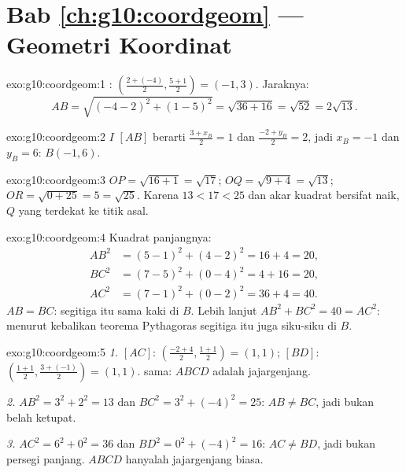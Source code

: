 \section*{Bab \ref{ch:g10:coordgeom} --- Geometri Koordinat}

\begin{solution}{exo:g10:coordgeom:1}
: $\left(\frac{2 + (-4)}{2}, \frac{5 + 1}{2}\right) = (-1, 3)$.
Jaraknya:
\[
AB = \sqrt{(-4 - 2)^2 + (1 - 5)^2} = \sqrt{36 + 16} = \sqrt{52}
= 2\sqrt{13}.
\]
\end{solution}

\begin{solution}{exo:g10:coordgeom:2}
$I$  $[AB]$ berarti $\frac{3 + x_B}{2} = 1$ dan
$\frac{-2 + y_B}{2} = 2$, jadi $x_B = -1$ dan $y_B = 6$: $B(-1, 6)$.
\end{solution}

\begin{solution}{exo:g10:coordgeom:3}
$OP = \sqrt{16 + 1} = \sqrt{17}$; $OQ = \sqrt{9 + 4} = \sqrt{13}$;
$OR = \sqrt{0 + 25} = 5 = \sqrt{25}$. Karena $13 < 17 < 25$ dan akar
kuadrat bersifat naik, $Q$ yang terdekat ke titik asal.
\end{solution}

\begin{solution}{exo:g10:coordgeom:4}
Kuadrat panjangnya:
\begin{align*}
AB^2 &= (5-1)^2 + (4-2)^2 = 16 + 4 = 20, \\
BC^2 &= (7-5)^2 + (0-4)^2 = 4 + 16 = 20, \\
AC^2 &= (7-1)^2 + (0-2)^2 = 36 + 4 = 40 .
\end{align*}
$AB = BC$: segitiga itu sama kaki di $B$. Lebih lanjut
$AB^2 + BC^2 = 40 = AC^2$: menurut kebalikan teorema Pythagoras segitiga
itu juga siku-siku di $B$.
\end{solution}

\begin{solution}{exo:g10:coordgeom:5}
\emph{1.}  $[AC]$:
$\left(\frac{-2+4}{2}, \frac{1+1}{2}\right) = (1, 1)$; 
$[BD]$: $\left(\frac{1+1}{2}, \frac{3+(-1)}{2}\right) = (1, 1)$.  sama: $ABCD$ adalah jajargenjang.

\emph{2.} $AB^2 = 3^2 + 2^2 = 13$ dan $BC^2 = 3^2 + (-4)^2 = 25$:
$AB \neq BC$, jadi bukan belah ketupat.

\emph{3.} $AC^2 = 6^2 + 0^2 = 36$ dan $BD^2 = 0^2 + (-4)^2 = 16$:
$AC \neq BD$, jadi bukan persegi panjang. $ABCD$ hanyalah jajargenjang biasa.
\end{solution}

